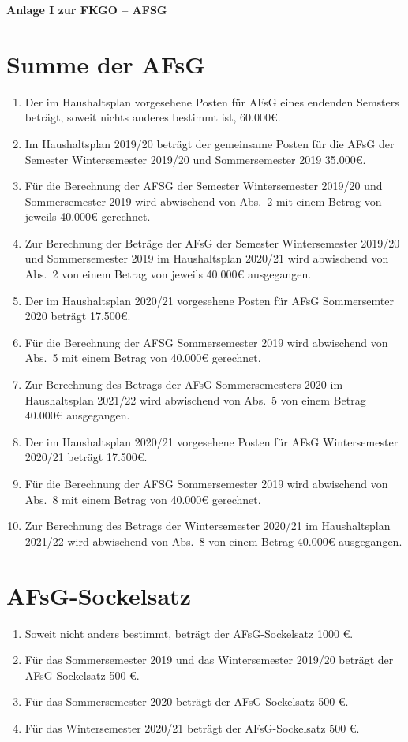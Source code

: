\documentclass{article}
\begin{document}
\begin{center}
    \huge \textbf{Anlage I zur FKGO -- AFSG}
\end{center}


\section{Summe der AFsG}
\begin{enumerate}[(1)]
    \item Der im Haushaltsplan vorgesehene Posten für AFsG eines endenden Semsters beträgt, soweit nichts anderes bestimmt ist, 60.000€.
    \item Im Haushaltsplan 2019/20 beträgt der gemeinsame Posten für die AFsG der Semester Wintersemester 2019/20 und Sommersemester 2019  35.000€.
    \item Für die Berechnung der AFSG der Semester Wintersemester 2019/20 und Sommersemester 2019 wird abwischend von Abs.\ 2 mit einem Betrag von jeweils 40.000€ gerechnet.
    \item Zur Berechnung der Beträge der AFsG der Semester Wintersemester 2019/20 und Sommersemester 2019 im Haushaltsplan 2020/21 wird abwischend von Abs.\ 2 von einem Betrag von jeweils 40.000€ ausgegangen.
    
    \item Der im Haushaltsplan 2020/21 vorgesehene Posten für AFsG Sommersemter 2020 beträgt 17.500€.
    \item Für die Berechnung der AFSG Sommersemester 2019 wird abwischend von Abs.\ 5 mit einem Betrag von 40.000€ gerechnet.
    \item Zur Berechnung des Betrags der AFsG Sommersemesters 2020 im Haushaltsplan 2021/22 wird abwischend von Abs.\ 5 von einem Betrag 40.000€ ausgegangen.
    
    \item Der im Haushaltsplan 2020/21 vorgesehene Posten für AFsG Wintersemester 2020/21 beträgt 17.500€.
    \item Für die Berechnung der AFSG Sommersemester 2019 wird abwischend von Abs.\ 8 mit einem Betrag von 40.000€ gerechnet.
    \item Zur Berechnung des Betrags der Wintersemester 2020/21 im Haushaltsplan 2021/22 wird abwischend von Abs.\ 8 von einem Betrag 40.000€ ausgegangen.
    
\end{enumerate}

\section{AFsG-Sockelsatz}
\begin{enumerate}[(1)]
	\item Soweit nicht anders bestimmt, beträgt der AFsG-Sockelsatz 1000 €.
    \item Für das Sommersemester 2019 und das Wintersemester 2019/20 beträgt der AFsG-Sockelsatz 500 €.
    \item Für das Sommersemester 2020 beträgt der AFsG-Sockelsatz 500 €.
     \item Für das Wintersemester 2020/21 beträgt der AFsG-Sockelsatz 500 €.
\end{enumerate}
\end{document}
